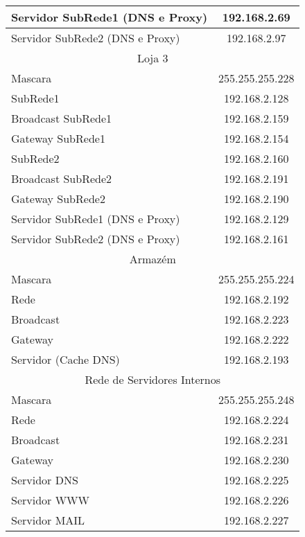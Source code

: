\documentclass[a4paper,12pt]{article}
\begin{document}
\begin{table}[ht]
\begin{tabular}{ l | c }
						Servidor SubRede1 (DNS e Proxy) & 192.168.2.69 \\\hline
						Servidor SubRede2 (DNS e Proxy) & 192.168.2.97 \\\hline
						
						\multicolumn{2}{c}{Loja 3} \\\hline 
						Mascara & 255.255.255.228 \\\hline
						
						SubRede1 & 192.168.2.128 \\\hline 
						Broadcast SubRede1 & 192.168.2.159 \\\hline
						Gateway SubRede1 & 192.168.2.154\\\hline
					
						SubRede2 & 192.168.2.160\\\hline 
						Broadcast SubRede2 & 192.168.2.191 \\\hline
						Gateway SubRede2 & 192.168.2.190 \\\hline
						
						Servidor SubRede1 (DNS e Proxy) & 192.168.2.129 \\\hline
						Servidor SubRede2 (DNS e Proxy) & 192.168.2.161 \\\hline
						
						\multicolumn{2}{c}{Armazém} \\\hline 
						Mascara & 255.255.255.224 \\\hline
						Rede & 192.168.2.192 \\\hline 
						Broadcast & 192.168.2.223 \\\hline 
						Gateway & 192.168.2.222 \\\hline
						Servidor (Cache DNS) & 192.168.2.193 \\\hline
						
						\multicolumn{2}{c}{Rede de Servidores Internos} \\\hline 
						Mascara & 255.255.255.248 \\\hline
						Rede & 192.168.2.224 \\\hline 
						Broadcast & 192.168.2.231 \\\hline 
						Gateway & 192.168.2.230 \\\hline
						Servidor DNS & 192.168.2.225 \\\hline
						Servidor WWW & 192.168.2.226 \\\hline
						Servidor MAIL & 192.168.2.227 \\\hline
						

\end{tabular}
\end{table}
\end{document}
